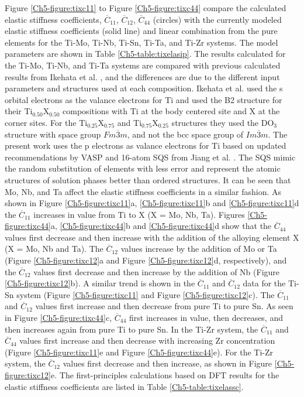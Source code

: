 Figure \ref{Ch5-figure:tixc11} to Figure \ref{Ch5-figure:tixc44} compare the calculated elastic stiffness coefficients, $\overline{C}_{11}$, $\overline{C}_{12}$, $\overline{C}_{44}$ (circles) with the currently modeled elastic stiffness coefficients (solid line) and linear combination from the pure elements for the Ti-Mo, Ti-Nb, Ti-Sn, Ti-Ta, and Ti-Zr systems. The model parameters are shown in Table \ref{Ch5-table:tixelasip}. The results calculated for the Ti-Mo, Ti-Nb, and Ti-Ta systems are compared with previous calculated results from Ikehata et al. \cite{Ikehata2004}, and the differences are due to the different input parameters and structures used at each composition. Ikehata et al. \cite{Ikehata2004} used the s orbital electrons as the valance electrons for Ti and used the B2 structure for their Ti$_{0.50}$X$_{0.50}$ compositions with Ti at the body centered site and X at the corner sites. For the Ti$_{0.25}$X$_{0.75}$ and Ti$_{0.75}$X$_{0.25}$ structures they used the DO$_{3}$ structure with space group $Fm\overline{3}m$, and not the bcc space group of $Im\overline{3}m$. The present work uses the p electrons as valance electrons for Ti based on updated recommendations by VASP and 16-atom SQS from Jiang et al. \cite{Jiang2004}. The SQS mimic the random substitution of elements with less error and represent the atomic structures of solution phases better than ordered structures. It can be seen that Mo, Nb, and Ta affect the elastic stiffness coefficients in a similar fashion. As shown in Figure \ref{Ch5-figure:tixc11}a, \ref{Ch5-figure:tixc11}b and \ref{Ch5-figure:tixc11}d the $\overline{C}_{11}$ increases in value from Ti to X (X = Mo, Nb, Ta). Figures \ref{Ch5-figure:tixc44}a, \ref{Ch5-figure:tixc44}b and \ref{Ch5-figure:tixc44}d show that the $\overline{C}_{44}$ values first decrease and then increase with the addition of the alloying element X (X = Mo, Nb and Ta). The $\overline{C}_{12}$ values increase by the addition of Mo or Ta (Figure \ref{Ch5-figure:tixc12}a and Figure \ref{Ch5-figure:tixc12}d, respectively), and the $\overline{C}_{12}$ values first decrease and then increase by the addition of Nb (Figure \ref{Ch5-figure:tixc12}b). A similar trend is shown in the $\overline{C}_{11}$ and $\overline{C}_{12}$ data for the Ti-Sn system (Figure \ref{Ch5-figure:tixc11} and Figure \ref{Ch5-figure:tixc12}c). The $\overline{C}_{11}$ and $\overline{C}_{12}$ values first increase and then decrease from pure Ti to pure Sn. As seen in Figure \ref{Ch5-figure:tixc44}c, $\overline{C}_{44}$ first increases in value, then decreases, and then increases again from pure Ti to pure Sn. In the Ti-Zr system, the $\overline{C}_{11}$ and $\overline{C}_{44}$ values first increase and then decrease with increasing Zr concentration (Figure \ref{Ch5-figure:tixc11}e and Figure \ref{Ch5-figure:tixc44}e). For the Ti-Zr system, the $\overline{C}_{12}$ values first decrease and then increase, as shown in Figure \ref{Ch5-figure:tixc12}e. The first-principles calculations based on DFT results for the elastic stiffness coefficients are listed in Table \ref{Ch5-table:tixelassc}.


